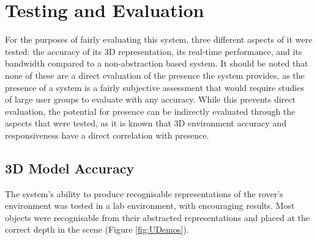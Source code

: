 \chapter{Testing and Evaluation}
\label{chapter:eval}

For the purposes of fairly evaluating this system, three different aspects of it were tested: the accuracy of its 3D representation, its real-time performance, and its bandwidth compared to a non-abstraction based system. It should be noted that none of these are a direct evaluation of the presence the system provides, as the presence of a system is a fairly subjective assessment that would require studies of large user groups to evaluate with any accuracy. While this prevents direct evaluation, the potential for presence can be indirectly evaluated through the aspects that were tested, as it is known that 3D environment accuracy and responsiveness have a direct correlation with presence.

\section{3D Model Accuracy}

The system's ability to produce recognisable representations of the rover's environment was tested in a lab environment, with encouraging results. Most objects were recognisable from their abstracted representations and placed at the correct depth in the scene (Figure \ref{fig:UDemos}). 

